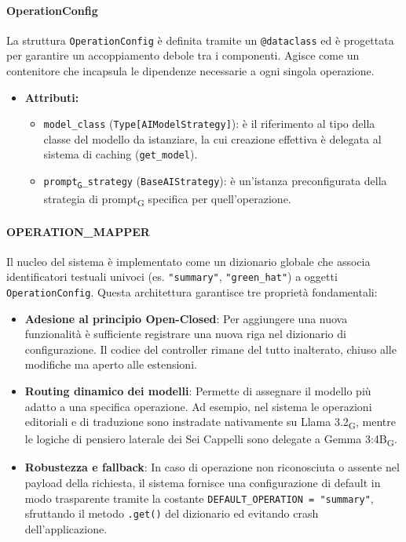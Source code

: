 \documentclass[11pt,a4paper]{article}
\newcommand{\gls}[1]{#1\textsubscript{G}}
\begin{document}
\paragraph{OperationConfig} 
La struttura \texttt{OperationConfig} è definita tramite un \texttt{@dataclass} ed è progettata per garantire un accoppiamento debole tra i componenti. Agisce come un contenitore che incapsula le dipendenze necessarie a ogni singola operazione.
\begin{itemize}
    \item\textbf{Attributi:}
\begin{itemize}
    \item \texttt{model\_class} (\texttt{Type[AIModelStrategy]}): è il riferimento al tipo della classe del modello da istanziare, la cui creazione effettiva è delegata al sistema di caching (\texttt{get\_model}).
    \item \texttt{\gls{prompt}\_strategy} (\texttt{BaseAIStrategy}): è un'istanza preconfigurata della strategia di \gls{prompt} specifica per quell'operazione.
\end{itemize}
\end{itemize}


\paragraph{OPERATION\_MAPPER}
Il nucleo del sistema è implementato come un dizionario globale che associa identificatori testuali univoci (es. \texttt{"summary"}, \texttt{"green\_hat"}) a oggetti \texttt{OperationConfig}. Questa architettura garantisce tre proprietà fondamentali:
\begin{itemize}
    \item \textbf{Adesione al principio Open-Closed}: Per aggiungere una nuova funzionalità è sufficiente registrare una nuova riga nel dizionario di configurazione. Il codice del controller rimane del tutto inalterato, chiuso alle modifiche ma aperto alle estensioni.
    \item \textbf{Routing dinamico dei modelli}: Permette di assegnare il modello più adatto a una specifica operazione. Ad esempio, nel sistema le operazioni editoriali e di traduzione sono instradate nativamente su \gls{Llama 3.2}, mentre le logiche di pensiero laterale dei Sei Cappelli sono delegate a \gls{Gemma 3:4B}.
    \item \textbf{Robustezza e fallback}: In caso di operazione non riconosciuta o assente nel payload della richiesta, il sistema fornisce una configurazione di default in modo trasparente tramite la costante \texttt{DEFAULT\_OPERATION = "summary"}, sfruttando il metodo \texttt{.get()} del dizionario ed evitando crash dell'applicazione.
\end{itemize}
\end{document}
